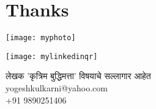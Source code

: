 \chapter*{Thanks}

\begin{minipage}[T]{0.5\textwidth}
    \centering
    \texttt{[image: myphoto]}
\end{minipage}%
\begin{minipage}[T]{0.5\textwidth}
	\centering
    \texttt{[image: mylinkedinqr]}
	
	लेखक 'कृत्रिम बुद्धिमत्ता' विषयाचे सल्लागार आहेत \\
	yogeshkulkarni@yahoo.com \\
	+91 9890251406
\end{minipage}
  

